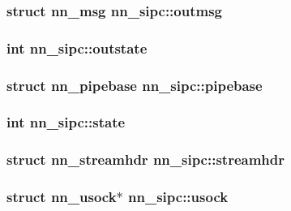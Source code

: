 \subsubsection[{outmsg}]{\setlength{\rightskip}{0pt plus 5cm}struct {\bf nn\+\_\+msg} nn\+\_\+sipc\+::outmsg}\hypertarget{structnn__sipc_a6a129285cd3d0abc998c255433750151}{}\label{structnn__sipc_a6a129285cd3d0abc998c255433750151}
\subsubsection[{outstate}]{\setlength{\rightskip}{0pt plus 5cm}int nn\+\_\+sipc\+::outstate}\hypertarget{structnn__sipc_aa55363371878ff4b4782147f123face8}{}\label{structnn__sipc_aa55363371878ff4b4782147f123face8}
\subsubsection[{pipebase}]{\setlength{\rightskip}{0pt plus 5cm}struct {\bf nn\+\_\+pipebase} nn\+\_\+sipc\+::pipebase}\hypertarget{structnn__sipc_ab5d0ceac7e850f4d12eff3a323e89824}{}\label{structnn__sipc_ab5d0ceac7e850f4d12eff3a323e89824}
\subsubsection[{state}]{\setlength{\rightskip}{0pt plus 5cm}int nn\+\_\+sipc\+::state}\hypertarget{structnn__sipc_aee023008a3ddf7b8a7b4bb4b3794dec2}{}\label{structnn__sipc_aee023008a3ddf7b8a7b4bb4b3794dec2}
\subsubsection[{streamhdr}]{\setlength{\rightskip}{0pt plus 5cm}struct {\bf nn\+\_\+streamhdr} nn\+\_\+sipc\+::streamhdr}\hypertarget{structnn__sipc_a8c72bf1257a05f914b59ce67e6b80a64}{}\label{structnn__sipc_a8c72bf1257a05f914b59ce67e6b80a64}
\subsubsection[{usock}]{\setlength{\rightskip}{0pt plus 5cm}struct {\bf nn\+\_\+usock}$\ast$ nn\+\_\+sipc\+::usock}\hypertarget{structnn__sipc_adc95a413352d2739ad66cb182ca34dbc}{}\label{structnn__sipc_adc95a413352d2739ad66cb182ca34dbc}
